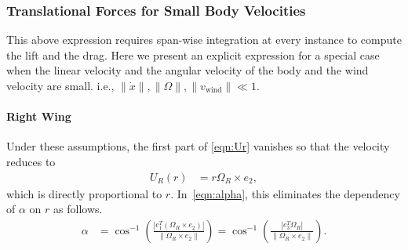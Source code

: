 \documentclass[10pt,draft]{article}
\begin{document}
\subsubsection{Translational Forces for Small Body Velocities}

This above expression requires span-wise integration at every instance to compute the lift and the drag. 
Here we present an explicit expression for a special case when the linear velocity and the angular velocity of the body and the wind velocity are small. i.e., $\|\dot x\|, \|\Omega\|, \|v_{\mathrm{wind}}\| \ll 1$.  

\paragraph{Right Wing}

Under these assumptions, the first part of \eqref{eqn:Ur} vanishes so that the velocity reduces to 
\begin{align*}
    U_R(r) & = r \Omega_R \times e_2,
\end{align*}
which is directly proportional to $r$. 
In~\eqref{eqn:alpha}, this eliminates the dependency of $\alpha$  on $r$ as follows.
\begin{align*}
    \alpha & = \cos^{-1} (\frac{ |e_1^T (\Omega_R \times e_2)|}{\|\Omega_R\times e_2\|}) = \cos^{-1} (\frac{ |e_3^T \Omega_R |}{\|\Omega_R \times e_2\|} ).
\end{align*}
\end{document}
